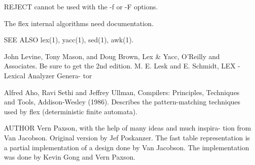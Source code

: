 \documentclass[12pt,spanish,twocolumn,lettersize]{article}
\begin{document}
{       REJECT cannot be used with the -f or -F options.

       The flex internal algorithms need documentation.

SEE ALSO
       lex(1), yacc(1), sed(1), awk(1).

       John Levine, Tony Mason,	 and  Doug  Brown,  Lex	 &  Yacc,
       O'Reilly	 and Associates.  Be sure to get the 2nd edition.
       M. E. Lesk and E. Schmidt, LEX - Lexical Analyzer  Genera-
       tor

       Alfred  Aho,  Ravi  Sethi  and  Jeffrey Ullman, Compilers:
       Principles, Techniques and Tools,  Addison-Wesley  (1986).
       Describes  the  pattern-matching	 techniques  used by flex
       (deterministic finite automata).

AUTHOR
       Vern Paxson, with the help of many ideas and much inspira-
       tion   from   Van   Jacobson.   Original	 version  by  Jef
       Poskanzer.  The fast table  representation  is  a  partial
       implementation  of  a  design  done  by Van Jacobson.  The
       implementation was done by Kevin Gong and Vern Paxson.

}
\end{document}
